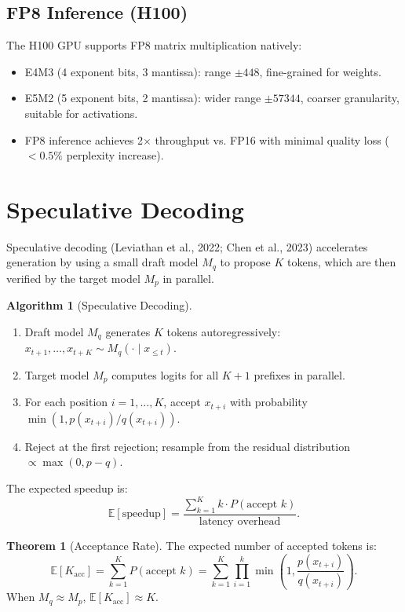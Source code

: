 \documentclass[11pt,a4paper]{book}
\theoremstyle{definition}
\newtheorem{theorem}{Theorem}[chapter]
\newtheorem{algorithm}{Algorithm}[chapter]
\begin{document}
\subsection{FP8 Inference (H100)}

The H100 GPU supports FP8 matrix multiplication natively:
\begin{itemize}
	\item E4M3 (4 exponent bits, 3 mantissa): range $\pm 448$, fine-grained for weights.
	\item E5M2 (5 exponent bits, 2 mantissa): wider range $\pm 57344$, coarser granularity, suitable for activations.
	\item FP8 inference achieves 2$\times$ throughput vs. FP16 with minimal quality loss ($< 0.5\%$ perplexity increase).
\end{itemize}

\section{Speculative Decoding}

Speculative decoding (Leviathan et al., 2022; Chen et al., 2023) accelerates generation by using a small draft model $M_q$ to propose $K$ tokens, which are then verified by the target model $M_p$ in parallel.

\begin{algorithm}[Speculative Decoding]
	\begin{enumerate}
		\item Draft model $M_q$ generates $K$ tokens autoregressively: $x_{t+1}, \dots, x_{t+K} \sim M_q(\cdot \mid x_{\leq t})$.
		\item Target model $M_p$ computes logits for all $K+1$ prefixes in parallel.
		\item For each position $i = 1, \dots, K$, accept $x_{t+i}$ with probability $\min(1, p(x_{t+i}) / q(x_{t+i}))$.
		\item Reject at the first rejection; resample from the residual distribution $\propto \max(0, p - q)$.
	\end{enumerate}
\end{algorithm}

The expected speedup is:
\begin{equation}
	\mathbb{E}[\text{speedup}] = \frac{\sum_{k=1}^K k \cdot P(\text{accept } k)}{\text{latency overhead}}.
\end{equation}

\begin{theorem}[Acceptance Rate]
	The expected number of accepted tokens is:
	\begin{equation}
		\mathbb{E}[K_{\text{acc}}] = \sum_{k=1}^K P(\text{accept } k) = \sum_{k=1}^K \prod_{i=1}^k \min\left(1, \frac{p(x_{t+i})}{q(x_{t+i})}\right).
	\end{equation}
	When $M_q \approx M_p$, $\mathbb{E}[K_{\text{acc}}] \approx K$.
\end{theorem}
\end{document}
